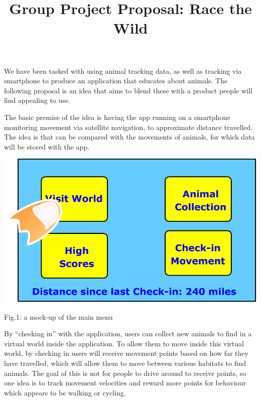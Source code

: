 \documentclass[]{article}
\title{Group Project Proposal: Race the Wild}
\author{}
\begin{document}
\maketitle

We have been tasked with using animal tracking data, as well as tracking via smartphone to produce an application that educates about animals. The following proposal is an idea that aims to blend these with a product people will find appealing to use.

The basic premise of the idea is having the app running on a smartphone monitoring movement via satellite navigation, to approximate distance travelled. The idea is that can be compared with the movements of animals, for which data will be stored with the app.


\begin{center}

\includegraphics[scale=0.2]{menu.png}

Fig.1: a mock-up of the main menu


\end{center}

By ``checking in'' with the application, users can collect new animals to find in a virtual world inside the application. To allow them to move inside this virtual world, by checking in users will receive movement points based on how far they have travelled, which will allow them to move between various habitats to find animals. The goal of this is not for people to drive around to receive points, so one idea is to track movement velocities and reward more points for behaviour which appears to be walking or cycling.
\end{document}
